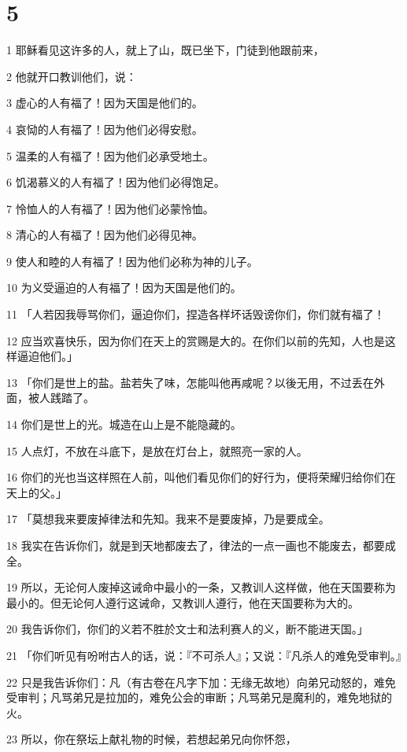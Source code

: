 \chapter{5}

\par 1 耶稣看见这许多的人，就上了山，既已坐下，门徒到他跟前来，
\par 2 他就开口教训他们，说：
\par 3 虚心的人有福了！因为天国是他们的。
\par 4 哀恸的人有福了！因为他们必得安慰。
\par 5 温柔的人有福了！因为他们必承受地土。
\par 6 饥渴慕义的人有福了！因为他们必得饱足。
\par 7 怜恤人的人有福了！因为他们必蒙怜恤。
\par 8 清心的人有福了！因为他们必得见神。
\par 9 使人和睦的人有福了！因为他们必称为神的儿子。
\par 10 为义受逼迫的人有福了！因为天国是他们的。
\par 11 「人若因我辱骂你们，逼迫你们，捏造各样坏话毁谤你们，你们就有福了！
\par 12 应当欢喜快乐，因为你们在天上的赏赐是大的。在你们以前的先知，人也是这样逼迫他们。」
\par 13 「你们是世上的盐。盐若失了味，怎能叫他再咸呢？以後无用，不过丢在外面，被人践踏了。
\par 14 你们是世上的光。城造在山上是不能隐藏的。
\par 15 人点灯，不放在斗底下，是放在灯台上，就照亮一家的人。
\par 16 你们的光也当这样照在人前，叫他们看见你们的好行为，便将荣耀归给你们在天上的父。」
\par 17 「莫想我来要废掉律法和先知。我来不是要废掉，乃是要成全。
\par 18 我实在告诉你们，就是到天地都废去了，律法的一点一画也不能废去，都要成全。
\par 19 所以，无论何人废掉这诫命中最小的一条，又教训人这样做，他在天国要称为最小的。但无论何人遵行这诫命，又教训人遵行，他在天国要称为大的。
\par 20 我告诉你们，你们的义若不胜於文士和法利赛人的义，断不能进天国。」
\par 21 「你们听见有吩咐古人的话，说：『不可杀人』；又说：『凡杀人的难免受审判。』
\par 22 只是我告诉你们：凡（有古卷在凡字下加：无缘无故地）向弟兄动怒的，难免受审判；凡骂弟兄是拉加的，难免公会的审断；凡骂弟兄是魔利的，难免地狱的火。
\par 23 所以，你在祭坛上献礼物的时候，若想起弟兄向你怀怨，
